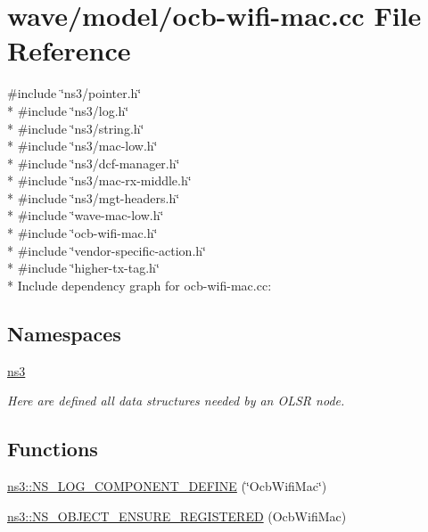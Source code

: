 \hypertarget{ocb-wifi-mac_8cc}{}\section{wave/model/ocb-\/wifi-\/mac.cc File Reference}
\label{ocb-wifi-mac_8cc}
{\ttfamily \#include \char`\"{}ns3/pointer.\+h\char`\"{}}\\*
{\ttfamily \#include \char`\"{}ns3/log.\+h\char`\"{}}\\*
{\ttfamily \#include \char`\"{}ns3/string.\+h\char`\"{}}\\*
{\ttfamily \#include \char`\"{}ns3/mac-\/low.\+h\char`\"{}}\\*
{\ttfamily \#include \char`\"{}ns3/dcf-\/manager.\+h\char`\"{}}\\*
{\ttfamily \#include \char`\"{}ns3/mac-\/rx-\/middle.\+h\char`\"{}}\\*
{\ttfamily \#include \char`\"{}ns3/mgt-\/headers.\+h\char`\"{}}\\*
{\ttfamily \#include \char`\"{}wave-\/mac-\/low.\+h\char`\"{}}\\*
{\ttfamily \#include \char`\"{}ocb-\/wifi-\/mac.\+h\char`\"{}}\\*
{\ttfamily \#include \char`\"{}vendor-\/specific-\/action.\+h\char`\"{}}\\*
{\ttfamily \#include \char`\"{}higher-\/tx-\/tag.\+h\char`\"{}}\\*
Include dependency graph for ocb-\/wifi-\/mac.cc\+:
\subsection*{Namespaces}
\begin{DoxyCompactItemize}
\item 
 \hyperlink{namespacens3}{ns3}
\begin{DoxyCompactList}\small\item\em Here are defined all data structures needed by an O\+L\+SR node. \end{DoxyCompactList}\end{DoxyCompactItemize}
\subsection*{Functions}
\begin{DoxyCompactItemize}
\item 
\hyperlink{namespacens3_ae2312c7da0ede403972d842ddc0f8904}{ns3\+::\+N\+S\+\_\+\+L\+O\+G\+\_\+\+C\+O\+M\+P\+O\+N\+E\+N\+T\+\_\+\+D\+E\+F\+I\+NE} (\char`\"{}Ocb\+Wifi\+Mac\char`\"{})
\item 
\hyperlink{namespacens3_a398debe2e113d3c62e13308d9ec961ff}{ns3\+::\+N\+S\+\_\+\+O\+B\+J\+E\+C\+T\+\_\+\+E\+N\+S\+U\+R\+E\+\_\+\+R\+E\+G\+I\+S\+T\+E\+R\+ED} (Ocb\+Wifi\+Mac)
\end{DoxyCompactItemize}
